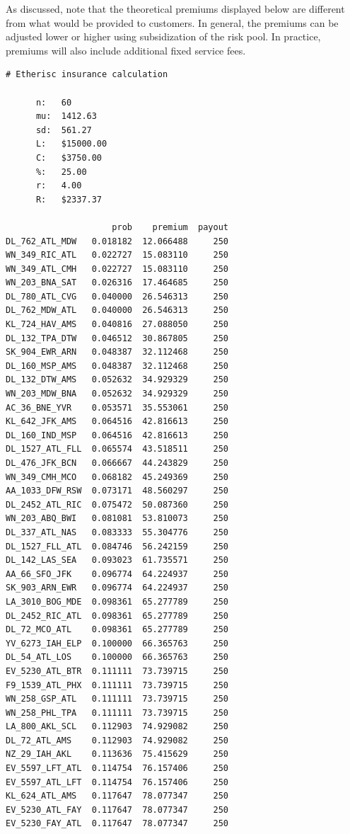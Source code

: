 \documentclass[12pt,a4paper]{article}
\begin{document}
As discussed, note that the theoretical premiums displayed below are different from what would be provided to customers. In general, the premiums can be adjusted lower or higher using subsidization of the risk pool. In practice, premiums will also include additional fixed service fees.

\begin{verbatim}# Etherisc insurance calculation

      n:   60
      mu:  1412.63
      sd:  561.27
      L:   $15000.00
      C:   $3750.00
      %:   25.00
      r:   4.00
      R:   $2337.37
    
                     prob    premium  payout
DL_762_ATL_MDW   0.018182  12.066488     250
WN_349_RIC_ATL   0.022727  15.083110     250
WN_349_ATL_CMH   0.022727  15.083110     250
WN_203_BNA_SAT   0.026316  17.464685     250
DL_780_ATL_CVG   0.040000  26.546313     250
DL_762_MDW_ATL   0.040000  26.546313     250
KL_724_HAV_AMS   0.040816  27.088050     250
DL_132_TPA_DTW   0.046512  30.867805     250
SK_904_EWR_ARN   0.048387  32.112468     250
DL_160_MSP_AMS   0.048387  32.112468     250
DL_132_DTW_AMS   0.052632  34.929329     250
WN_203_MDW_BNA   0.052632  34.929329     250
AC_36_BNE_YVR    0.053571  35.553061     250
KL_642_JFK_AMS   0.064516  42.816613     250
DL_160_IND_MSP   0.064516  42.816613     250
DL_1527_ATL_FLL  0.065574  43.518511     250
DL_476_JFK_BCN   0.066667  44.243829     250
WN_349_CMH_MCO   0.068182  45.249369     250
AA_1033_DFW_RSW  0.073171  48.560297     250
DL_2452_ATL_RIC  0.075472  50.087360     250
WN_203_ABQ_BWI   0.081081  53.810073     250
DL_337_ATL_NAS   0.083333  55.304776     250
DL_1527_FLL_ATL  0.084746  56.242159     250
DL_142_LAS_SEA   0.093023  61.735571     250
AA_66_SFO_JFK    0.096774  64.224937     250
SK_903_ARN_EWR   0.096774  64.224937     250
LA_3010_BOG_MDE  0.098361  65.277789     250
DL_2452_RIC_ATL  0.098361  65.277789     250
DL_72_MCO_ATL    0.098361  65.277789     250
YV_6273_IAH_ELP  0.100000  66.365763     250
DL_54_ATL_LOS    0.100000  66.365763     250
EV_5230_ATL_BTR  0.111111  73.739715     250
F9_1539_ATL_PHX  0.111111  73.739715     250
WN_258_GSP_ATL   0.111111  73.739715     250
WN_258_PHL_TPA   0.111111  73.739715     250
LA_800_AKL_SCL   0.112903  74.929082     250
DL_72_ATL_AMS    0.112903  74.929082     250
NZ_29_IAH_AKL    0.113636  75.415629     250
EV_5597_LFT_ATL  0.114754  76.157406     250
EV_5597_ATL_LFT  0.114754  76.157406     250
KL_624_ATL_AMS   0.117647  78.077347     250
EV_5230_ATL_FAY  0.117647  78.077347     250
EV_5230_FAY_ATL  0.117647  78.077347     250

\end{verbatim}
\end{document}
